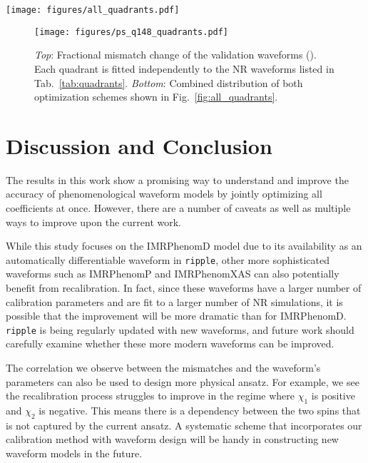 \documentclass[twocolumn]{aastex631}
\newcommand{\ripple}{\texttt{ripple}}
\begin{document}
\begin{figure*}[t]
	\centering
	\texttt{[image: figures/all\_quadrants.pdf]}
	\caption{Distributions of mismatches for both optimization schemes in all 4 regions of Fig.~\ref{fig:ps_q148_quadrant}. 
	We use a constant PSD to calculate the mismatch and
	$\mathcal{L}_{\mathrm{ave}}$ as the loss function. The medians of each distributions are indicated by dashed
	lines.}
	\label{fig:all_quadrants}
\end{figure*}

\begin{figure}[t]
	\centering
	\texttt{[image: figures/ps\_q148\_quadrants.pdf]}
	\caption{\textit{Top}: Fractional mismatch change of the validation waveforms ().
	Each quadrant is fitted independently to the NR waveforms listed in Tab.~\ref{tab:quadrants}.
	\textit{Bottom}: Combined distribution of both optimization schemes shown in Fig.~\ref{fig:all_quadrants}.}
	\label{fig:ps_q148_quadrant}
\end{figure}

\section{Discussion and Conclusion} \label{sec:discussion}

The results in this work show a promising way to understand and improve the
accuracy of phenomenological waveform models by jointly optimizing all
coefficients at once. However, there are a number of caveats as well
as multiple ways to improve upon the current work.

While this study focuses on the IMRPhenomD model due to its availability as an
automatically differentiable waveform in \ripple, other more sophisticated waveforms such as
IMRPhenomP \citep{hannam2014simple, khan2019phenomenological} and IMRPhenomXAS
\citep{pratten2020setting,pratten2021computationally} can also potentially benefit
from recalibration. In fact, since these waveforms have a larger number of calibration
parameters and are fit to a larger number of NR simulations, it is possible that the 
improvement will be more dramatic than for IMRPhenomD. {\ripple} is being regularly
updated with new waveforms, and future work should carefully examine whether these more
modern waveforms can be improved. %

The correlation we observe between the mismatches and the waveform's parameters
can also be used to design more physical ansatz. For example, we see the
recalibration process struggles to improve in the regime where $\chi_{1}$ is
positive and $\chi_{2}$ is negative. This means there is a dependency between
the two spins that is not captured by the current ansatz. A systematic scheme that
incorporates our calibration method with waveform design will be handy in
constructing new waveform models in the future. 
\end{document}
